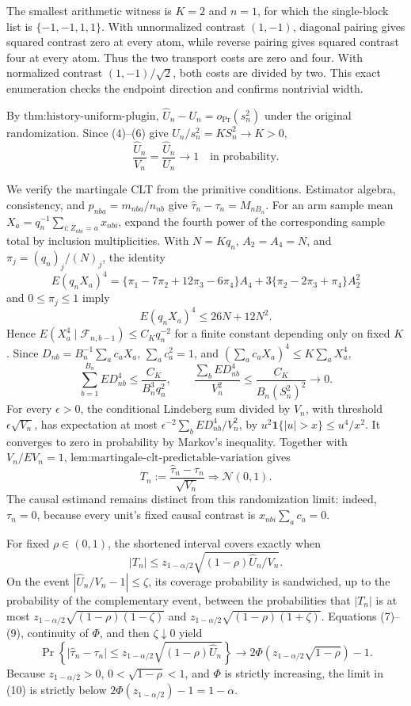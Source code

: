 The smallest arithmetic witness is \(K=2\) and \(n=1\), for which the single-block list is \(\{-1,-1,1,1\}\). With unnormalized contrast \((1,-1)\), diagonal pairing gives squared contrast zero at every atom, while reverse pairing gives squared contrast four at every atom. Thus the two transport costs are zero and four. With normalized contrast \((1,-1)/\sqrt2\), both costs are divided by two. This exact enumeration checks the endpoint direction and confirms nontrivial width.

By \(\text{thm:history-uniform-plugin}\),
\(\widehat U_n-U_n=o_{\Pr}(s_n^2)\) under the original randomization. Since (4)--(6) give \(U_n/s_n^2=KS_n^2\to K>0\),
\[
\frac{\widehat U_n}{V_n}=\frac{\widehat U_n}{U_n}\longrightarrow1
\quad\text{in probability}.
\tag{7}
\]

We verify the martingale CLT from the primitive conditions. Estimator algebra, consistency, and \(p_{nba}=m_{nba}/n_{nb}\) give \(\widehat\tau_n-\tau_n=M_{nB_n}\). For an arm sample mean
\(X_a=q_n^{-1}\sum_{i:Z_{nbi}=a}x_{nbi}\), expand the fourth power of the corresponding sample total by inclusion multiplicities. With \(N=Kq_n\), \(A_2=A_4=N\), and \(\pi_j=(q_n)_j/(N)_j\), the identity
\[
E(q_nX_a)^4
=\{\pi_1-7\pi_2+12\pi_3-6\pi_4\}A_4
+3\{\pi_2-2\pi_3+\pi_4\}A_2^2
\]
and \(0\le\pi_j\le1\) imply
\[
E(q_nX_a)^4\le26N+12N^2.
\]
Hence \(E(X_a^4\mid\mathcal F_{n,b-1})\le C_Kq_n^{-2}\) for a finite constant depending only on fixed \(K\). Since
\(D_{nb}=B_n^{-1}\sum_ac_aX_a\), \(\sum_ac_a^2=1\), and
\((\sum_ac_aX_a)^4\le K\sum_aX_a^4\),
\[
\sum_{b=1}^{B_n}ED_{nb}^4
\le\frac{C_K}{B_n^3q_n^2},
\qquad
\frac{\sum_bED_{nb}^4}{V_n^2}
\le\frac{C_K}{B_n(S_n^2)^2}\longrightarrow0.
\tag{8}
\]
For every \(\epsilon>0\), the conditional Lindeberg sum divided by \(V_n\), with threshold \(\epsilon\sqrt{V_n}\), has expectation at most \(\epsilon^{-2}\sum_bED_{nb}^4/V_n^2\), by \(u^2\mathbf1\{|u|>x\}\le u^4/x^2\). It converges to zero in probability by Markov's inequality. Together with \(V_n/EV_n=1\), \(\text{lem:martingale-clt-predictable-variation}\) gives
\[
T_n:=\frac{\widehat\tau_n-\tau_n}{\sqrt{V_n}}
\Rightarrow\mathcal N(0,1).
\tag{9}
\]
The causal estimand remains distinct from this randomization limit: indeed, \(\tau_n=0\), because every unit's fixed causal contrast is \(x_{nbi}\sum_ac_a=0\).

For fixed \(\rho\in(0,1)\), the shortened interval covers exactly when
\[
|T_n|\le z_{1-\alpha/2}
\sqrt{(1-\rho)\widehat U_n/V_n}.
\]
On the event \(|\widehat U_n/V_n-1|\le\zeta\), its coverage probability is sandwiched, up to the probability of the complementary event, between the probabilities that \(|T_n|\) is at most
\(z_{1-\alpha/2}\sqrt{(1-\rho)(1-\zeta)}\) and
\(z_{1-\alpha/2}\sqrt{(1-\rho)(1+\zeta)}\). Equations (7)--(9), continuity of \(\Phi\), and then \(\zeta\downarrow0\) yield
\[
\Pr\!\left\{|\widehat\tau_n-\tau_n|\le z_{1-\alpha/2}
\sqrt{(1-\rho)\widehat U_n}\right\}
\longrightarrow
2\Phi\!\left(z_{1-\alpha/2}\sqrt{1-\rho}\right)-1.
\tag{10}
\]
Because \(z_{1-\alpha/2}>0\), \(0<\sqrt{1-\rho}<1\), and \(\Phi\) is strictly increasing, the limit in (10) is strictly below
\(2\Phi(z_{1-\alpha/2})-1=1-\alpha\).

